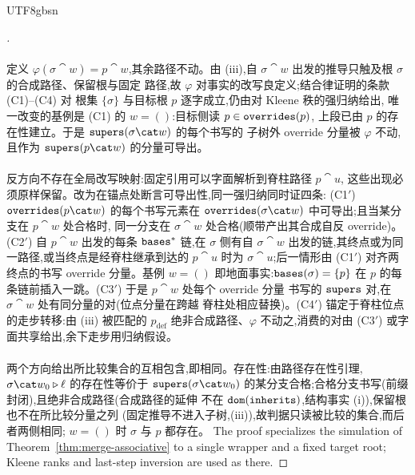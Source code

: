 \begin{CJK*}{UTF8}{gbsn}
\begin{proof}[]
  \paragraph{}
  定义 $\varphi(\sigma \cat w) = p \cat w$,其余路径不动。由 (iii),自
  $\sigma \cat w$ 出发的推导只触及根 $\sigma$ 的合成路径、保留根与固定
  路径,故 $\varphi$ 对事实的改写良定义;结合律证明的条款 (C1)--(C4) 对
  根集 $\{\sigma\}$ 与目标根 $p$ 逐字成立,仍由对 Kleene 秩的强归纳给出,
  唯一改变的基例是 (C1) 的 $w = ()$:目标侧读 $p \in \mathtt{overrides}(p)$,
  上段已由 $p$ 的存在性建立。于是 $\supers(\sigma \cat w)$ 的每个书写的
  子树外 override 分量被 $\varphi$ 不动,且作为
  $\supers(p \cat w)$ 的分量可导出。

  \paragraph{}
  反方向不存在全局改写映射:固定引用可以字面解析到脊柱路径 $p \cat u$,
  这些出现必须原样保留。改为在锚点处断言可导出性,同一强归纳同时证四条:
  (C1$'$) $\overrides(p \cat w)$ 的每个书写元素在
  $\overrides(\sigma \cat w)$ 中可导出;且当某分支在 $p \cat w$ 处合格时,
  同一分支在 $\sigma \cat w$ 处合格(顺带产出其合成自反 override)。
  (C2$'$) 自 $p \cat w$ 出发的每条 $\mathtt{bases}^*$ 链,在 $\sigma$ 侧有自
  $\sigma \cat w$ 出发的链,其终点或为同一路径,或当终点是经脊柱继承到达的
  $p \cat u$ 时为 $\sigma \cat u$;后一情形由 (C1$'$) 对齐两终点的书写
  override 分量。基例 $w = ()$ 即地面事实:$\mathtt{bases}(\sigma) = \{p\}$ 在
  $p$ 的每条链前插入一跳。(C3$'$) 于是 $p \cat w$ 处每个 override 分量
  书写的 $\mathtt{supers}$ 对,在 $\sigma \cat w$ 处有同分量的对(位点分量在跨越
  脊柱处相应替换)。(C4$'$) 锚定于脊柱位点的走步转移:由 (iii) 被匹配的
  $p_{\mathrm{def}}$ 绝非合成路径、$\varphi$ 不动之,消费的对由 (C3$'$)
  或字面共享给出,余下走步用归纳假设。

  \paragraph{}
  两个方向给出所比较集合的互相包含,即相同。存在性:由路径存在性引理,
  $\sigma \cat w_0 \snoc \ell$ 的存在性等价于 $\supers(\sigma \cat w_0)$
  的某分支合格;合格分支书写(前缀封闭),且绝非合成路径(合成路径的延伸
  不在 $\mathtt{dom}(\mathtt{inherits})$,结构事实 (i)),保留根也不在所比较分量之列
  (固定推导不进入子树,(iii)),故判据只读被比较的集合,而后者两侧相同;
  $w = ()$ 时 $\sigma$ 与 $p$ 都存在。
\else
  The proof specializes the simulation of
  Theorem~\ref{thm:merge-associative} to a single wrapper and a
  fixed target root; Kleene ranks and last-step inversion are used
  as there.


\end{proof}
\end{CJK*}
